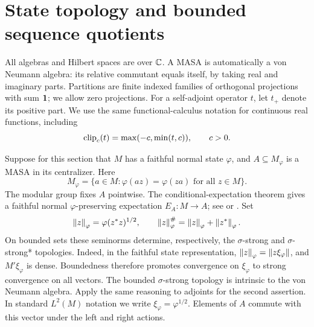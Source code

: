 \section{State topology and bounded sequence quotients}
\label{sec:preliminaries}

All algebras and Hilbert spaces are over \(\mathbb C\).
A MASA is automatically a von Neumann algebra: its relative commutant
equals itself, by taking real and imaginary parts.
Partitions are finite indexed families of orthogonal projections with
sum \(\mathbf 1\); we allow zero projections.
For a self-adjoint operator \(t\), let \(t_+\) denote its positive part.
We use the same functional-calculus notation for continuous real
functions, including
\[
 \operatorname{clip}_c(t)=\max(-c,\min(t,c)),\qquad c>0.
\]

Suppose for this section that \(M\) has a faithful normal state
\(\varphi\), and \(A\subseteq M_\varphi\) is a MASA in its centralizer.
Here
\[
 M_\varphi=\{a\in M:\varphi(az)=\varphi(za)\text{ for all }z\in M\}.
\]
The modular group fixes \(A\) pointwise. The conditional-expectation
theorem gives a faithful normal \(\varphi\)-preserving expectation
\(E_A:M\to A\); see \cite{Takesaki72} or \cite[Theorem~6.6]{Hiai20}.
Set
\[
 \left\lVert z\right\rVert_\varphi=\varphi(z^*z)^{1/2},
 \qquad
 \left\lVert z\right\rVert_\varphi^\#=\left\lVert z\right\rVert_\varphi+\left\lVert z^*\right\rVert_\varphi.
\]
On bounded sets these seminorms determine, respectively, the
\(\sigma\)-strong and \(\sigma\)-strong* topologies.
Indeed, in the faithful state representation,
\(\left\lVert z\right\rVert_\varphi=\left\lVert z\xi_\varphi\right\rVert\), and \(M'\xi_\varphi\) is
dense. Boundedness therefore promotes convergence on \(\xi_\varphi\)
to strong convergence on all vectors. The bounded
\(\sigma\)-strong topology is intrinsic to the von Neumann algebra.
Apply the same reasoning to adjoints for the second assertion.
In standard \(L^2(M)\) notation we write
\(\xi_\varphi=\varphi^{1/2}\). Elements of \(A\) commute with this
vector under the left and right actions.

